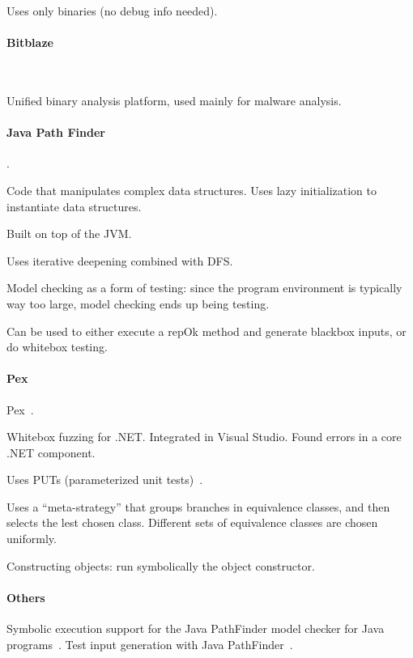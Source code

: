 Uses only binaries (no debug info needed).

\paragraph{Bitblaze}~\cite{bitBlaze}

Unified binary analysis platform, used mainly for malware analysis.

\paragraph{Java Path Finder}

\cite{jpf-symbex,jpf-testgen,generalized-symbex}.

Code that manipulates complex data structures.  Uses lazy initialization to instantiate data structures.

Built on top of the JVM.

Uses iterative deepening combined with DFS.

Model checking as a form of testing: since the program environment is typically way too large, model checking ends up being testing.

Can be used to either execute a repOk method and generate blackbox inputs, or do whitebox testing.

\paragraph{Pex}

Pex~\cite{tillmann-pex}.

Whitebox fuzzing for .NET.  Integrated in Visual Studio.  Found errors in a core .NET component.

Uses PUTs (parameterized unit tests)~\cite{tillmann-puts}.

Uses a ``meta-strategy'' that groups branches in equivalence classes, and then selects the lest chosen class.  Different sets of equivalence classes are chosen uniformly.

Constructing objects: run symbolically the object constructor.

\paragraph{Others}

Symbolic execution support for the Java PathFinder model checker for Java programs~\cite{jpf-symbex}.  Test input generation with Java PathFinder~\cite{jpf-testgen}.

